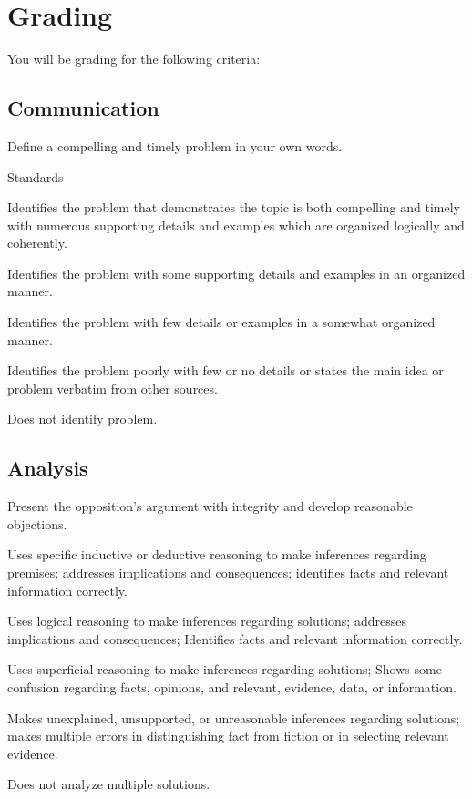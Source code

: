 \section{Grading}

You will be grading for the following criteria:

\subsection{Communication}

Define a compelling and timely problem in your own words. 

Standards

\begin{enumerate*}
	\item Identifies the problem that demonstrates the topic is both compelling and timely with numerous supporting details and examples which are organized logically and coherently.		
	\item Identifies the problem with some supporting details and examples in an organized manner.	
	\item Identifies the problem with few details or examples in a somewhat organized manner.	
	\item Identifies the problem poorly with few or no details or states the main idea or problem verbatim from other sources.
	\item Does not identify problem.
\end{enumerate*}

\subsection{Analysis}

Present the opposition's argument with integrity and develop reasonable objections.

\begin{enumerate*}
	\item Uses specific inductive or deductive reasoning to make inferences regarding premises; addresses implications and consequences; identifies facts and relevant information correctly.	
	\item Uses logical reasoning to make inferences regarding solutions; addresses implications and consequences; Identifies facts and relevant information correctly.		
	\item Uses superficial reasoning to make inferences regarding solutions; Shows some confusion regarding facts, opinions, and relevant, evidence, data, or information.	
	\item Makes unexplained, unsupported, or unreasonable inferences regarding solutions; makes multiple errors in distinguishing fact from fiction or in selecting relevant evidence. 	
	\item Does not analyze multiple solutions.
\end{enumerate*}


